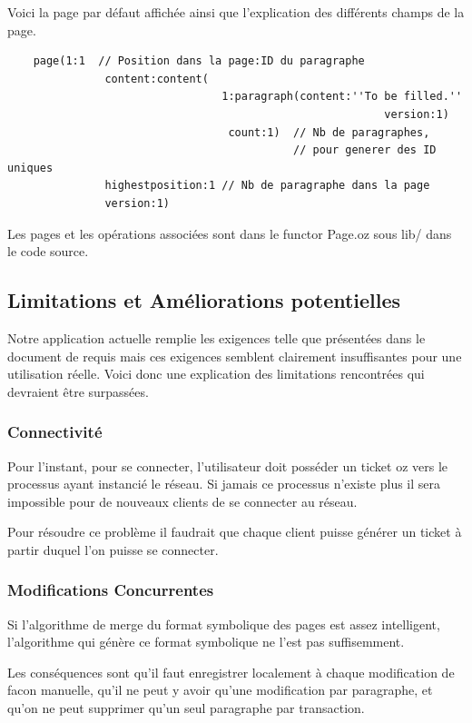 \documentclass{article}
\begin{document}
	\newpage	
	Voici la page par défaut affichée ainsi que l'explication des différents champs de la page.

	\begin{verbatim}
	page(1:1  // Position dans la page:ID du paragraphe
	           content:content(
	                             1:paragraph(content:''To be filled.'' 
	                                                      version:1) 
	                              count:1)  // Nb de paragraphes,
	                               	        // pour generer des ID uniques
	           highestposition:1 // Nb de paragraphe dans la page
	           version:1) 
	\end{verbatim}	
	
	Les pages et les opérations associées sont dans le functor Page.oz sous lib/ dans le code source.
	
	
	\subsection{Limitations et Améliorations potentielles}
	Notre application actuelle remplie les exigences telle que présentées dans le document de requis
	mais ces exigences semblent clairement insuffisantes pour une utilisation réelle.  Voici donc une
	explication des limitations rencontrées qui devraient être surpassées.
	\subsubsection{Connectivité} 
		Pour l'instant, pour se connecter, l'utilisateur doit posséder
		un ticket oz vers le processus ayant instancié le réseau.
		Si jamais ce processus n'existe plus il sera impossible pour de
		nouveaux clients de se connecter au réseau. 
		
		Pour résoudre ce problème il faudrait que chaque client puisse
		générer un ticket à partir duquel l'on puisse se connecter.
		
	 \subsubsection{Modifications Concurrentes}
	 	Si l'algorithme de merge du format symbolique des pages est
	 	assez intelligent, l'algorithme qui génère ce format symbolique
	 	ne l'est pas suffisemment. 
	 	
	 	Les conséquences sont qu'il faut enregistrer localement à 
	 	chaque modification de facon manuelle, qu'il ne peut y avoir qu'une modification par
	 	paragraphe, et qu'on ne peut supprimer qu'un seul paragraphe par
	 	transaction. 
	 	
\end{document}
